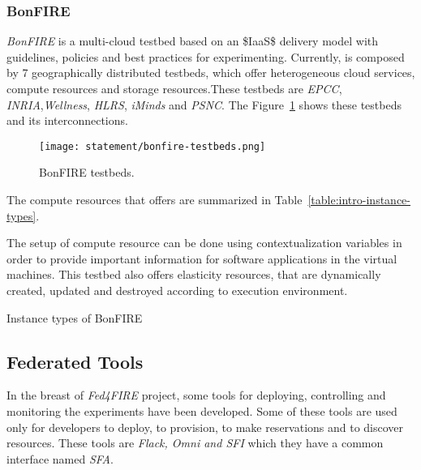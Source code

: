 \subsubsection{BonFIRE}

\emph{BonFIRE} is a multi-cloud testbed based on an \ac{$IaaS$}
delivery model with guidelines, policies and best practices for
experimenting. Currently, \bonfire is composed by 7 geographically distributed
testbeds, which offer heterogeneous cloud services, compute resources and
storage resources.These testbeds are \emph{EPCC},\emph{ INRIA},\emph{Wellness},\emph{ HLRS}, \emph{iMinds} and \emph{PSNC}. The Figure~\ref{fig:intr-bonfire-testbeds} shows these testbeds and its interconnections.

\begin{figure}[!h]
\begin{center}
\texttt{[image: statement/bonfire-testbeds.png]}
\caption{BonFIRE testbeds.}
\label{fig:intr-bonfire-testbeds}
\end{center}
\end{figure}

The compute resources that \bonfire offers are summarized in Table~\ref{table:intro-instance-types}.



The setup of compute resource can be done using contextualization variables in
order to provide important information for software applications in the virtual
machines. 
This testbed also offers elasticity resources, that are dynamically created,
updated and destroyed according to execution environment.

\begin{table}[H]
  \centering
  {\small
  
  }
  \caption{Instance types of BonFIRE}
  \label{table:intro-instance-types}
\end{table}


\subsection{Federated Tools}
\label{subsec:federatedtools}
In the breast of \emph{Fed4FIRE} project, some tools for deploying, controlling and
monitoring the experiments have been developed. 
Some of these tools are used only for developers to deploy, to provision, to
make reservations and to discover resources. These tools are \emph{Flack, Omni
  and SFI} which they have a common interface named \emph{SFA}.

